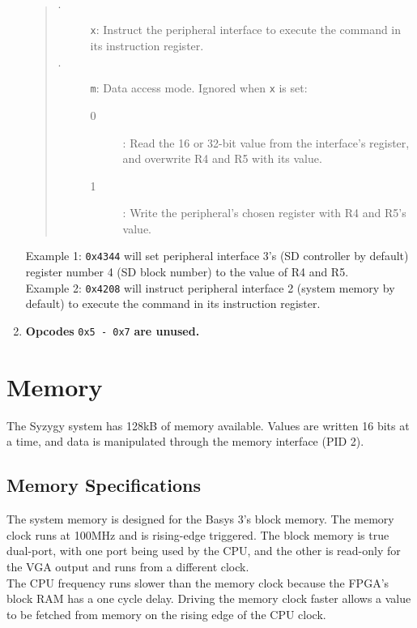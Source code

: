 \documentclass{article}
\begin{document}
\begin{enumerate}
\begin{quote}
\begin{description}
\begin{description}
					\end{description}
					\item[$\cdot$] \texttt{x}: Instruct the peripheral interface to execute the command in its instruction register.
					\item[$\cdot$] \texttt{m}: Data access mode. Ignored when \texttt{x} is set:
					\begin{description}
						\item[0]: Read the 16 or 32-bit value from the interface's register, and overwrite R4 and R5 with its value.
						\item[1]: Write the peripheral's chosen register with R4 and R5's value.
					\end{description}
				\end{description}
			\end{quote}
			Example 1: \texttt{0x4344} will set peripheral interface 3's (SD controller by default) register number 4 (SD block number) to the value of R4 and R5.\\
			Example 2: \texttt{0x4208} will instruct peripheral interface 2 (system memory by default) to execute the command in its instruction register.\\
			
			\item \textbf{Opcodes } \texttt{0x5 - 0x7} \textbf{are unused.}
			
			\end{enumerate}
			
	\section{Memory}

		The Syzygy system has 128kB of memory available. Values are written 16 bits at a time, and data is manipulated through the memory interface (PID 2).

		\subsection{Memory Specifications}
		
			The system memory is designed for the Basys 3's block memory. The memory clock runs at 100MHz and is rising-edge triggered. The block memory is true dual-port, with one port being used by the CPU, and the other is read-only for the VGA output and runs from a different clock.\\
			
			The CPU frequency runs slower than the memory clock because the FPGA's block RAM has a one cycle delay. Driving the memory clock faster allows a value to be fetched from memory on the rising edge of the CPU clock.
\end{document}
